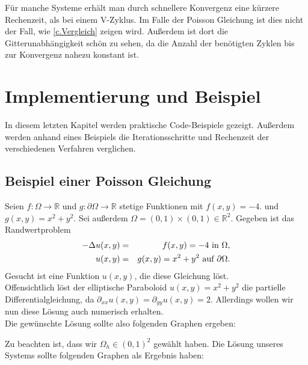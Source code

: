 Für manche Systeme erhält man durch schnellere Konvergenz eine kürzere Rechenzeit, als bei einem V-Zyklus. Im Falle der Poisson Gleichung ist dies nicht der Fall, wie \autoref{c.Vergleich} zeigen wird. Außerdem ist dort die Gitterunabhängigkeit schön zu sehen, da die Anzahl der benötigten Zyklen bis zur Konvergenz nahezu konstant ist.

\chapter{Implementierung und Beispiel}\label{c.Vergleich}

In diesem letzten Kapitel werden praktische Code-Beispiele gezeigt. Außerdem werden anhand eines Beispiels die Iterationsschritte und Rechenzeit der verschiedenen Verfahren verglichen.

\section{Beispiel einer Poisson Gleichung}\label{s.Beispiel einer Poisson Gleichung}

Seien $f: \Omega \rightarrow \mathbb{R}$ und $g: \partial\Omega \rightarrow \mathbb{R}$ stetige Funktionen mit $f(x,y) = -4.$ und \\$g(x,y) = x^{2} + y^{2}$. Sei außerdem $\Omega = (0,1)\times(0,1) \in \mathbb{R}^{2}$. Gegeben ist das Randwertproblem
\begin{eqnarray}
        -\Delta u(x,y) &=& f(x,y) = -4 \textnormal{ in } \Omega, \\
    u(x,y) &=& g(x,y) = x^{2} + y^{2} \textnormal{ auf } \partial \Omega.
\end{eqnarray}
Gesucht ist eine Funktion $u(x,y)$, die diese Gleichung löst. \\
Offensichtlich löst der elliptische Paraboloid $u(x,y) = x^{2} + y^{2}$ die partielle Differentialgleichung, da $\partial_{xx}u(x,y) = \partial_{yy}u(x,y) = 2$. Allerdings wollen wir nun diese Lösung auch numerisch erhalten.\\
Die gewünschte Lösung sollte also folgenden Graphen ergeben:


Zu beachten ist, dass wir $\Omega_{h} \in (0,1)^{2}$ gewählt haben. Die Lösung unseres Systems sollte folgenden Graphen als Ergebnis haben:

